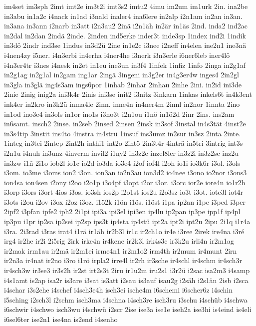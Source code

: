 {im4set
im3sph
2imt
imt2e
im3t2i
imt3s2
imtu2
4imu
im2um
im1urk
2in.
ina2be
in3abu
in1a2c
i4nack
in1ad
i3nald
inaler4
ina6lere
in2alp
i2n1am
in2an
in3an.
in3ana
in3ann
i2narb
in3att
i2n3au2
2inä
i2n1äh
in2är
in1äs
2ind.
inda2
ind2ac
in2dal
in2dan
2indä
2inde.
2inden
ind5erke
inder3t
inde3sp
1index
ind2i
1indik
in3dö
2indr
ind3se
1indus
in3d2ü
2ine
in1e2c
i3nee
i2neff
in4elen
ine2n1
ine3nä
i4nen4zy
i5ner.
i4n3erbi
in4erha
i4ner4he
i3nerk
i3n3erle
i6ner6leb
iner4lö
i4n3er4tr
i3nes
i4nesk
in2et
in1eu
ine3un
in3f4
1infek
1infiz
1info
2inga
in2g1af
in2g1ag
in2g1al
in2gam
ing1ar
2ingä
3ingeni
in3g2er
in4g3er4w
inges4
2in2gl
in3gla
in3glä
ing4s3am
ings6por
1inhab
2inhar
2inhau
2inhe
2ini.
in2id
ini3de
2inie
2inig
inig2a
ini3k4r
2inis
ini3se
init2
i3nitz
3inkarn
1inkas
inkels6t
in4k3ent
ink4er
in2kro
in3k2ü
inma4le
2inn.
inne4n
in4ner4m
2innl
in2nor
1innta
2ino
in1od
ino3e4
in3ols
in1or
ino1s
i3no3t
i2n1ou
i1nö
in1ö2d
2inr
2ins.
ins2am
in6samt.
insch2
2inse.
in2seb
2insed
2insen
2insk
in3sof
3instal
in4s3tät
4inst2e
in3s4tip
3instit
ins4to
4instra
in4strü
1insuf
ins3umz
in2sur
in3sz
2inta
2inte.
1integ
in3tei
2intep
2int2h
inthi1
int2o
2intö
2in3t4r
4inträ
in5tri
3intrig
int3s
i2n1u
i4nuh
in3unz
4inverm
invil2
i1ny2
in3z2e
inzel8ler
in3z2i
in3z2sc
inz2u
in3zw
i1ñ
2i1o
iob2l
io1c
io2d
io3da
io3e4
i2of
iof4l
i2oh
io1i
io3k6r
i3ol.
i3ols
i3om.
io3me
i3oms
ion2
i3on.
ion3an
io2n3au
ion3d2
io4nee
i3ono
io2nor
i3ons3
ion4sa
ion4sen
i2ony
i2oo
i2o1p
i3o4pf
i3opt
i2or
i3or.
i3orc
ior2e
iore4n
io1r2h
i3orp
i3ors
i3ort
4ios
i3os.
io3sh
ios2p
i2o1st
ios2u
i2o3sz
io3t
i3ot.
iote3l
iot4r
i3ots
i2ou
i2ov
i3ox
i2oz
i3oz.
i1ö2k
i1ön
i1ös.
i1öst
i1pa
ip2an
i1pe
i3ped
i3per
2ipf2
i3pfan
ipfe2
iph2
2i1pi
ipi3a
ipi3el
ipi3en
ip4lu
ip2pan
ip3pe
ipp1f
ip4pl
ip3pu
i1pr
ip2sa
ip2sei
ip2sp
ips3t
ip4sta
ip4stü
ipt2a
ipt2i
ipt2u
2ipu
2i1q
i1r4a
i3ra.
2i3rad
i3ras
irat4
i1rä
ir1äh
ir2b3l
ir1c
ir2ch1o
ir4e
i3ree
2irek
ire4na
i3ré
irg4
ir2he
ir2i
2i5rig
2irk
irke4n
ir4kene
ir2k3l
irk4s3c
ir3k2u
irli4n
ir2m1ag
ir2mak
irm1au
ir2mä
ir2m1ei
irme4n1
ir2m1o2
irm4th
ir2mum
ir4munt
2irn
ir2n3a
ir4nat
ir2no
i3ro
i1rö
irpla2
irre4l
ir2rh
ir3sche
ir4schl
ir4schm
ir4sch3r
ir4sch3w
ir3se3
ir3s2h
ir2st
irt2s3t
2iru
ir1u2m
iru2s1
i3r2ü
i2sac
isa2m3
i4samp
i4s1amt
is2ap
isa2r
is3are
i3sat
is3att
i2sau
is3auf
isau2g
i2säh
i2s1än
2isb
i2sca
i4schar
i3s2che
i4schef
i4sch3e4h
isch3ei
ische4m
i6schemi
i6scher6z
i4schin
i5sching
i2sch3l
i2schm
isch3ma
i4schna
i4sch3re
isch3ru
i3schu
i4schüb
i4schwa
i6schwir
i4schwo
isch3wu
i4schwü
i2scr
2ise
ise3a
ise1e
iseh2a
ise3hi
is4eind
is4eli
i6sel6ter
ise2n1
ise4na
is2end
i4senho
}
